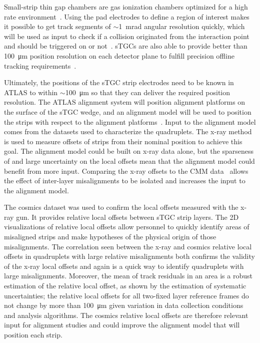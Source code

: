 Small-strip thin gap chambers are gas ionization chambers optimized for a high rate environment~\cite{nsw_tdr}. Using the pad electrodes to define a region of interest makes it possible to get track segments of $\sim$\SI{1}{mrad} angular resolution quickly, which will be used as input to check if a collision originated from the interaction point and should be triggered on or not~\cite{nsw_tdr, perez-codina_small-strip_2016}. sTGCs are also able to provide better than \SI{100}{\micro\meter} position resolution on each detector plane to fulfill precision offline tracking requirements~\cite{abusleme_performance_2016}. 

Ultimately, the positions of the sTGC strip electrodes need to be known in ATLAS to within $\sim$\SI{100}{\micro\meter} so that they can deliver the required position resolution. The ATLAS alignment system will position alignment platforms on the surface of the sTGC wedge, and an alignment model will be used to position the strips with respect to the alignment platforms~\cite{nsw_tdr}. Input to the alignment model comes from the datasets used to characterize the quadruplets. The x-ray method~\cite{lefebvre_precision_2020} is used to measure offsets of strips from their nominal position to achieve this goal. The alignment model could be built on x-ray data alone, but the sparseness of and large uncertainty on the local offsets mean that the alignment model could benefit from more input. Comparing the x-ray offsets to the CMM data~\cite{carlson_results_2019} allows the effect of inter-layer misalignments to be isolated and increases the input to the alignment model. 

The cosmics dataset was used to confirm the local offsets measured with the x-ray gun. It provides relative local offsets between sTGC strip layers. The 2D visualizations of relative local offsets allow personnel to quickly identify areas of misaligned strips and make hypotheses of the physical origin of those misalignments. The correlation seen between the x-ray and cosmics relative local offsets in quadruplets with large relative misalignments both confirms the validity of the x-ray local offsets and again is a quick way to identify quadruplets with large misalignments. Moreover, the mean of track residuals in an area is a robust estimation of the relative local offset, as shown by the estimation of systematic uncertainties; the relative local offsets for all two-fixed layer reference frames do not change by more than \SI{100}{\micro\meter} given variation in data collection conditions and analysis algorithms. The cosmics relative local offsets are therefore relevant input for alignment studies and could improve the alignment model that will position each strip. 

